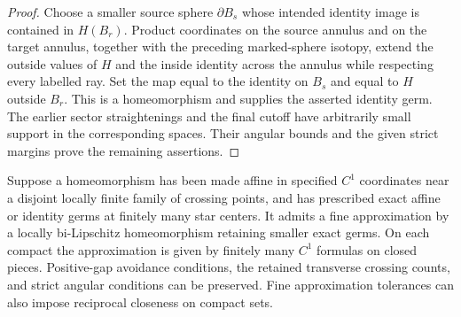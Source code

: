 \begin{proof}
Choose a smaller source sphere $\partial B_s$ whose intended identity
image is contained in $H(B_r)$.  Product coordinates on the source
annulus and on the target annulus, together with the preceding
marked-sphere isotopy, extend the outside values of $H$ and the
inside identity across the annulus while respecting every labelled
ray.  Set the map equal to the identity on $B_s$ and equal to $H$
outside $B_r$.  This is a homeomorphism and supplies the asserted
identity germ.  The earlier sector straightenings and the final
cutoff have arbitrarily small support in the corresponding spaces.
Their angular bounds and the given strict margins prove the
remaining assertions.
\end{proof}

\begin{lemma}
\label{lt:relative-germs}
Suppose a homeomorphism has been made affine in specified $C^1$
coordinates near a disjoint locally finite family of crossing
points, and has prescribed exact affine or identity germs at
finitely many star centers.  It admits a fine approximation by a
locally bi-Lipschitz homeomorphism retaining smaller exact germs.
On each compact the approximation is given by finitely many $C^1$
formulas on closed pieces.  Positive-gap avoidance conditions,
the retained transverse crossing counts, and strict angular
conditions can be preserved.  Fine approximation tolerances can
also impose reciprocal closeness on compact sets.
\end{lemma}

